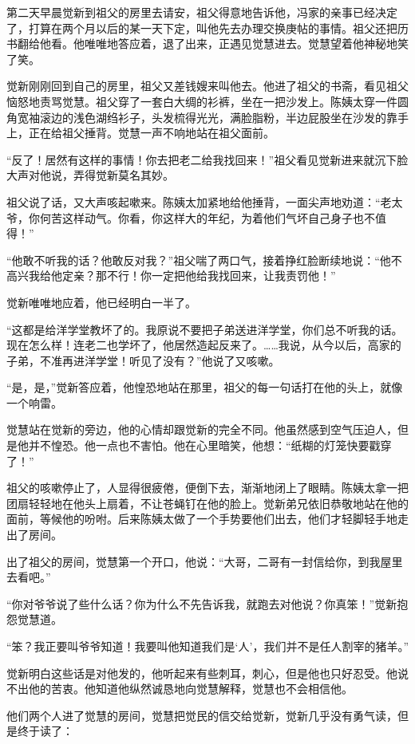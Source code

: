 \par 第二天早晨觉新到祖父的房里去请安，祖父得意地告诉他，冯家的亲事已经决定了，打算在两个月以后的某一天下定，叫他先去办理交换庚帖的事情。祖父还把历书翻给他看。他唯唯地答应着，退了出来，正遇见觉慧进去。觉慧望着他神秘地笑了笑。
\par 觉新刚刚回到自己的房里，祖父又差钱嫂来叫他去。他进了祖父的书斋，看见祖父恼怒地责骂觉慧。祖父穿了一套白大绸的衫裤，坐在一把沙发上。陈姨太穿一件圆角宽袖滚边的浅色湖绉衫子，头发梳得光光，满脸脂粉，半边屁股坐在沙发的靠手上，正在给祖父捶背。觉慧一声不响地站在祖父面前。
\par “反了！居然有这样的事情！你去把老二给我找回来！”祖父看见觉新进来就沉下脸大声对他说，弄得觉新莫名其妙。
\par 祖父说了话，又大声咳起嗽来。陈姨太加紧地给他捶背，一面尖声地劝道：“老太爷，你何苦这样动气。你看，你这样大的年纪，为着他们气坏自己身子也不值得！”
\par “他敢不听我的话？他敢反对我？”祖父喘了两口气，接着挣红脸断续地说：“他不高兴我给他定亲？那不行！你一定把他给我找回来，让我责罚他！”
\par 觉新唯唯地应着，他已经明白一半了。
\par “这都是给洋学堂教坏了的。我原说不要把子弟送进洋学堂，你们总不听我的话。现在怎么样！连老二也学坏了，他居然造起反来了。……我说，从今以后，高家的子弟，不准再进洋学堂！听见了没有？”他说了又咳嗽。
\par “是，是，”觉新答应着，他惶恐地站在那里，祖父的每一句话打在他的头上，就像一个响雷。
\par 觉慧站在觉新的旁边，他的心情却跟觉新的完全不同。他虽然感到空气压迫人，但是他并不惶恐。他一点也不害怕。他在心里暗笑，他想：“纸糊的灯笼快要戳穿了！”
\par 祖父的咳嗽停止了，人显得很疲倦，便倒下去，渐渐地闭上了眼睛。陈姨太拿一把团扇轻轻地在他头上扇着，不让苍蝇钉在他的脸上。觉新弟兄依旧恭敬地站在他的面前，等候他的吩咐。后来陈姨太做了一个手势要他们出去，他们才轻脚轻手地走出了房间。
\par 出了祖父的房间，觉慧第一个开口，他说：“大哥，二哥有一封信给你，到我屋里去看吧。”
\par “你对爷爷说了些什么话？你为什么不先告诉我，就跑去对他说？你真笨！”觉新抱怨觉慧道。
\par “笨？我正要叫爷爷知道！我要叫他知道我们是‘人’，我们并不是任人割宰的猪羊。”
\par 觉新明白这些话是对他发的，他听起来有些刺耳，刺心，但是他也只好忍受。他说不出他的苦衷。他知道他纵然诚恳地向觉慧解释，觉慧也不会相信他。
\par 他们两个人进了觉慧的房间，觉慧把觉民的信交给觉新，觉新几乎没有勇气读，但是终于读了：
